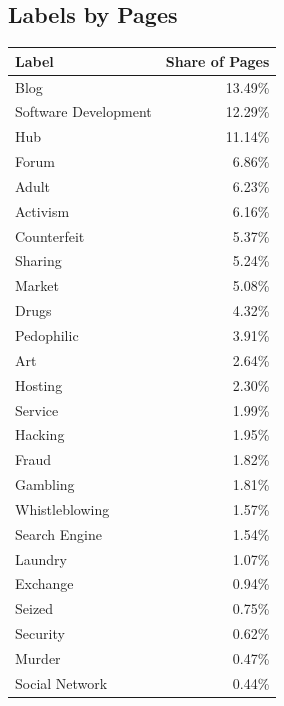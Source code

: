 \documentclass[USenglish,oneside,twocolumn]{article}
\begin{document}
\subsection{Labels by Pages}
\label{appendix:labelsByPages}
\begin{center}
    \begin{supertabular}[H]{p{4cm} | r{3.5cm}}
    \textbf{Label}		&	\textbf{Share of Pages}\\
	\hline
	\hline
	Blog		&	13.49\%\\
	\hline
	Software Development	&	12.29\%\\
	\hline
	Hub		&	11.14\%\\
	\hline
	Forum		&	6.86\%\\
	\hline
	Adult		&	6.23\%\\
	\hline
	Activism	&	6.16\%\\
	\hline
	Counterfeit	&	5.37\%\\
	\hline
	Sharing		&	5.24\%\\
	\hline
	Market		&	5.08\%\\
	\hline
	Drugs		&	4.32\%\\
	\hline
	Pedophilic	&	3.91\%\\
	\hline
	Art			&	2.64\%\\
	\hline
	Hosting		&	2.30\%\\
	\hline
	Service		&	1.99\%\\
	\hline
	Hacking		&	1.95\%\\
	\hline
	Fraud		&	1.82\%\\
	\hline
	Gambling	&	1.81\%\\
	\hline
	Whistleblowing			&	1.57\%\\
	\hline
	Search Engine			&	1.54\%\\
	\hline
	Laundry		&	1.07\%\\
	\hline
	Exchange	&	0.94\%\\
	\hline
	Seized		&	0.75\%\\
	\hline
	Security	&	0.62\%\\
	\hline
	Murder		&	0.47\%\\
	\hline
	Social Network			&	0.44\%\\
    \end{supertabular}
\end{center}
\end{document}
